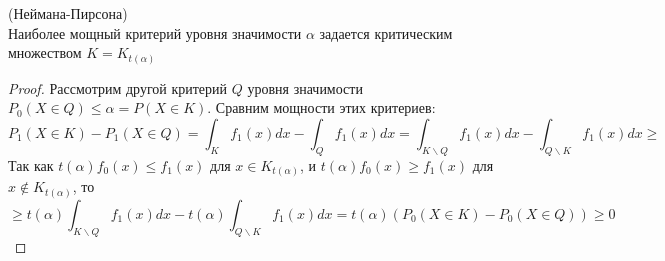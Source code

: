 \begin{theorem} (Неймана-Пирсона) \\
Наиболее мощный критерий уровня значимости $\alpha$ задается критическим множеством $K = K_{t\left(\alpha\right)}$
\end{theorem}
\begin{proof}
Рассмотрим другой критерий $Q$ уровня значимости $P_0\left(X \in Q\right) \leq \alpha = P\left(X \in K\right)$. Сравним мощности этих критериев:
\[
    P_1\left(X \in K\right) - P_1\left(X \in Q\right) = \int_K f_1\left(x\right) dx - \int_Q f_1\left(x\right) dx = \int_{K \backslash Q} f_1\left(x\right) dx - \int_{Q \backslash K} f_1\left(x\right) dx \geq 
\]
Так как $t\left(\alpha\right) f_0\left(x\right) \leq f_1\left(x\right)$ для $x \in K_{t\left(\alpha\right)}$, и $t\left(\alpha\right) f_0\left(x\right) \geq f_1\left(x\right)$ для $x \not\in K_{t\left(\alpha\right)}$, то
\[
    \geq t\left(\alpha\right)\int_{K \backslash Q} f_1\left(x\right) dx - t\left(\alpha\right)\int_{Q \backslash K} f_1\left(x\right) dx = t\left(\alpha\right) \left(P_0\left(X \in K\right) - P_0\left(X \in Q\right)\right) \geq 0
\]
\end{proof}

